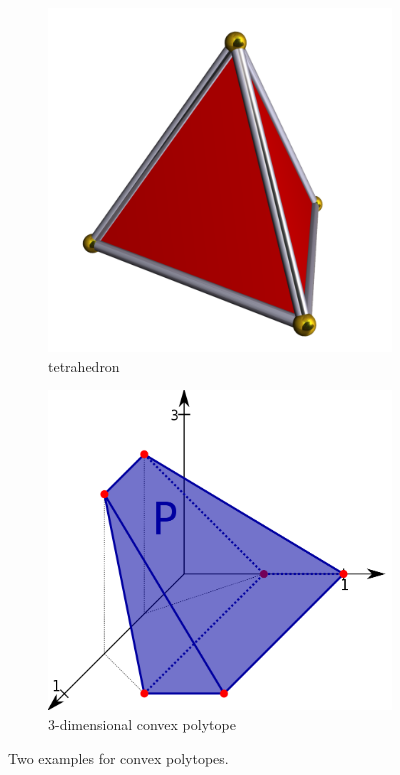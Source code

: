 \documentclass[]{article}
\begin{document}
\begin{figure}[!h]
	\begin{subfigure}{0.5\textwidth}
		\includegraphics[width=1\linewidth,height=\textwidth]{Tetrahedron}
		\caption{tetrahedron}
	\end{subfigure}
	\begin{subfigure}{0.5\textwidth}
		\includegraphics[width=1\linewidth,height=\textwidth]{3dpoly}
		\caption{3-dimensional convex polytope}
	\end{subfigure}
	\caption{Two examples for convex polytopes.}
	\label{Fig:polytope}
\end{figure}
\end{document}

